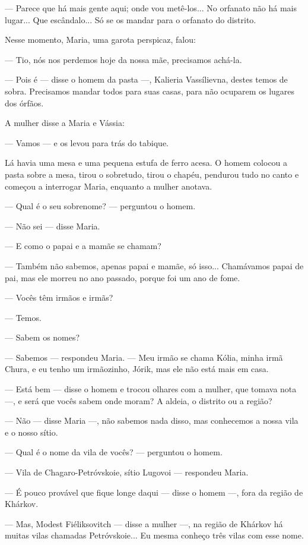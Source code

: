 --- Parece que há mais gente aqui; onde vou metê-los... No orfanato não
há mais lugar... Que escândalo... Só se os mandar para o orfanato do
distrito.

Nesse momento, Maria, uma garota perspicaz, falou:

--- Tio, nós nos perdemos hoje da nossa mãe, precisamos achá-la.

--- Pois é --- disse o homem da pasta ---, Kalieria Vassílievna, destes
temos de sobra. Precisamos mandar todos para suas casas, para não
ocuparem os lugares dos órfãos.

A mulher disse a Maria e Vássia:

--- Vamos --- e os levou para trás do tabique.

Lá havia uma mesa e uma pequena estufa de ferro acesa. O homem colocou a
pasta sobre a mesa, tirou o sobretudo, tirou o chapéu, pendurou tudo no
canto e começou a interrogar Maria, enquanto a mulher anotava.

--- Qual é o seu sobrenome? --- perguntou o homem.

--- Não sei --- disse Maria.

--- E como o papai e a mamãe se chamam?

--- Também não sabemos, apenas papai e mamãe, só isso... Chamávamos
papai de pai, mas ele morreu no ano passado, porque foi um ano de fome.

--- Vocês têm irmãos e irmãs?

--- Temos.

--- Sabem os nomes?

--- Sabemos --- respondeu Maria. --- Meu irmão se chama Kólia, minha
irmã Chura, e eu tenho um irmãozinho, Jórik, mas ele não está mais em
casa.

--- Está bem --- disse o homem e trocou olhares com a mulher, que tomava
nota ---, e será que vocês sabem onde moram? A aldeia, o distrito ou a
região?

--- Não --- disse Maria ---, não sabemos nada disso, mas conhecemos a
nossa vila e o nosso sítio.

--- Qual é o nome da vila de vocês? --- perguntou o homem.

--- Vila de Chagaro-Petróvskoie, sítio Lugovoi --- respondeu Maria.

--- É pouco provável que fique longe daqui --- disse o homem ---, fora
da região de Khárkov.

--- Mas, Modest Fiéliksovitch --- disse a mulher ---, na região de
Khárkov há muitas vilas chamadas Petróvskoie... Eu mesma conheço três
vilas com esse nome.

